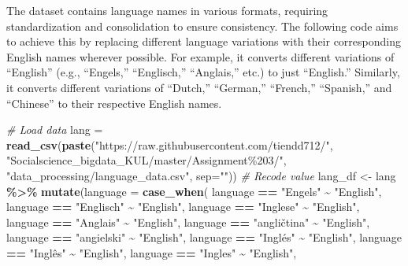 \documentclass[11pt,]{article}
\newenvironment{Shaded}{\begin{snugshade}}{\end{snugshade}}
\newcommand{\AttributeTok}[1]{\textcolor[rgb]{0.13,0.29,0.53}{#1}}
\newcommand{\CommentTok}[1]{\textcolor[rgb]{0.56,0.35,0.01}{\textit{#1}}}
\newcommand{\FunctionTok}[1]{\textcolor[rgb]{0.13,0.29,0.53}{\textbf{#1}}}
\newcommand{\NormalTok}[1]{#1}
\newcommand{\OtherTok}[1]{\textcolor[rgb]{0.56,0.35,0.01}{#1}}
\newcommand{\SpecialCharTok}[1]{\textcolor[rgb]{0.81,0.36,0.00}{\textbf{#1}}}
\newcommand{\StringTok}[1]{\textcolor[rgb]{0.31,0.60,0.02}{#1}}
\begin{document}
The dataset contains language names in various formats, requiring
standardization and consolidation to ensure consistency. The following
code aims to achieve this by replacing different language variations
with their corresponding English names wherever possible. For example,
it converts different variations of ``English'' (e.g., ``Engels,''
``Englisch,'' ``Anglais,'' etc.) to just ``English.'' Similarly, it
converts different variations of ``Dutch,'' ``German,'' ``French,''
``Spanish,'' and ``Chinese'' to their respective English names.

\begin{Shaded}
\begin{Highlighting}[]
\CommentTok{\# Load data}
\NormalTok{lang }\OtherTok{=} \FunctionTok{read\_csv}\NormalTok{(}\FunctionTok{paste}\NormalTok{(}\StringTok{"https://raw.githubusercontent.com/tiendd712/"}\NormalTok{,}
                      \StringTok{"Socialscience\_bigdata\_KUL/master/Assignment\%203/"}\NormalTok{,}
                      \StringTok{"data\_processing/language\_data.csv"}\NormalTok{, }\AttributeTok{sep=}\StringTok{""}\NormalTok{))}
\CommentTok{\# Recode value}
\NormalTok{lang\_df }\OtherTok{\textless{}{-}}\NormalTok{ lang }\SpecialCharTok{\%\textgreater{}\%}
  \FunctionTok{mutate}\NormalTok{(}\AttributeTok{language =} \FunctionTok{case\_when}\NormalTok{(}
\NormalTok{    language }\SpecialCharTok{==} \StringTok{"Engels"} \SpecialCharTok{\textasciitilde{}} \StringTok{"English"}\NormalTok{,}
\NormalTok{    language }\SpecialCharTok{==} \StringTok{"Englisch"} \SpecialCharTok{\textasciitilde{}} \StringTok{"English"}\NormalTok{,}
\NormalTok{    language }\SpecialCharTok{==} \StringTok{"Inglese"} \SpecialCharTok{\textasciitilde{}} \StringTok{"English"}\NormalTok{,}
\NormalTok{    language }\SpecialCharTok{==} \StringTok{"Anglais"} \SpecialCharTok{\textasciitilde{}} \StringTok{"English"}\NormalTok{, }
\NormalTok{    language }\SpecialCharTok{==} \StringTok{"angličtina"} \SpecialCharTok{\textasciitilde{}} \StringTok{"English"}\NormalTok{, }
\NormalTok{    language }\SpecialCharTok{==} \StringTok{"angielski"} \SpecialCharTok{\textasciitilde{}} \StringTok{"English"}\NormalTok{, }
\NormalTok{    language }\SpecialCharTok{==} \StringTok{"Inglés"} \SpecialCharTok{\textasciitilde{}} \StringTok{"English"}\NormalTok{,}
\NormalTok{    language }\SpecialCharTok{==} \StringTok{"Inglês"} \SpecialCharTok{\textasciitilde{}} \StringTok{"English"}\NormalTok{, }
\NormalTok{    language }\SpecialCharTok{==} \StringTok{"Ingles"} \SpecialCharTok{\textasciitilde{}} \StringTok{"English"}\NormalTok{, }

\end{Highlighting}
\end{Shaded}
\end{document}
